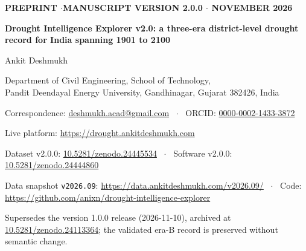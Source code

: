 \documentclass[10pt,a4paper]{article}
\begin{document}
\begin{center}
{\footnotesize\bfseries\color{gray!60!black} PREPRINT \quad$\cdot$\quad MANUSCRIPT VERSION 2.0.0 \quad$\cdot$ NOVEMBER 2026}\\[10pt]
{\LARGE\bfseries Drought Intelligence Explorer v2.0: a three-era district-level drought record for India spanning 1901 to 2100\par}
\vspace{14pt}
{\large Ankit Deshmukh\par}
\vspace{4pt}
{\small Department of Civil Engineering, School of Technology,\\Pandit Deendayal Energy University, Gandhinagar, Gujarat 382426, India\par}
\vspace{2pt}
{\small Correspondence: \href{mailto:deshmukh.acad@gmail.com}{deshmukh.acad@gmail.com} \ $\cdot$ \ ORCID: \href{https://orcid.org/0000-0002-1433-3872}{0000-0002-1433-3872}\par}
\vspace{6pt}
{\small Live platform: \url{https://drought.ankitdeshmukh.com}\par}
\vspace{1pt}
{\small Dataset v2.0.0: \href{https://doi.org/10.5281/zenodo.24445534}{10.5281/zenodo.24445534} \ $\cdot$ \ Software v2.0.0: \href{https://doi.org/10.5281/zenodo.24444860}{10.5281/zenodo.24444860}\par}
\vspace{1pt}
{\small Data snapshot \texttt{v2026.09}: \url{https://data.ankitdeshmukh.com/v2026.09/} \ $\cdot$ \ Code: \url{https://github.com/anixn/drought-intelligence-explorer}\par}
\vspace{1pt}
{\small Supersedes the version 1.0.0 release (2026-11-10), archived at \href{https://doi.org/10.5281/zenodo.24113364}{10.5281/zenodo.24113364}; the validated era-B record is preserved without semantic change.\par}
\vspace{10pt}
\end{center}

\vspace{4pt}
\end{document}
